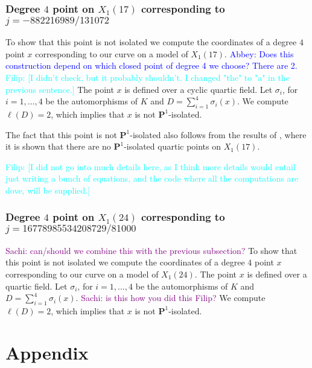 \documentclass[11pt,reqno]{amsart}
\theoremstyle{plain}
\theoremstyle{definition}
\newcommand{\PP}{\mathbf P}
\newcommand{\filip}[1]{{\textcolor{cyan}{Filip: [#1]}}}
\newcommand{\abbey}[1]{\textcolor{blue}{Abbey: #1}}
\newcommand{\sachi}[1]{\textcolor{purple}{Sachi: #1}}
\newcommand{\fedit}[1]{{\color{cyan} #1}}
\begin{document}
\subsubsection{Degree $4$ point on $X_1(17)$ corresponding to $j=-882216989/131072$}
To show that this point is not isolated we compute the coordinates of \fedit{a} degree $4$ point $x$ corresponding to our curve on a model of $X_1(17)$. \abbey{Does this construction depend on which closed point of degree 4 we choose? There are 2.} \filip{I didn't check, but it probably shouldn't. I changed "the" to "a" in the previous sentence.} The point $x$ is defined over a cyclic quartic field. Let $\sigma_i$, for $i=1,\ldots, 4$ be the automorphisms of $K$ and $D=\sum_{i=1}^4\sigma_i(x)$. We compute $\ell(D)=2$, which implies that $x$ is not $\PP^1$-isolated.

The fact that this point is not $\PP^1$-isolated also follows from the results of \cite[Proposition 6.7]{DerickxMazurKamienny}, where it is shown that there are no $\PP^1$-isolated quartic points on $X_1(17)$.


\filip{I did not go into much details here, as I think more details would entail just writing a bunch of equations, and the code where all the computations are dove, will be supplied.}

\subsubsection{Degree $4$ point on $X_1(24)$ corresponding to $j=16778985534208729/81000$}
\sachi{can/should we combine this with the previous subsection?}
To show that this point is not isolated we compute the coordinates of a degree $4$ point $x$ corresponding to our curve on a model of $X_1(24)$. The point $x$ is defined over a quartic field. Let $\sigma_i$, for $i=1,\ldots, 4$ be the automorphisms of $K$ and $D=\sum_{i=1}^4\sigma_i(x)$. \sachi{is this how you did this Filip?}
We compute $\ell(D)=2$, which implies that $x$ is not $\PP^1$-isolated.

\newpage
\section*{Appendix}
\label{appendix}
\end{document}
